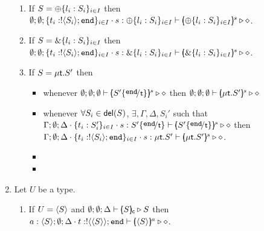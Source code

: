 \begin{proposition}
\begin{enumerate}
\begin{enumerate}
			\item	If $S = \oplus \{l_i: S_i\}_{i \in I}$ then \\
					$\emptyset; \emptyset; \{t_i: ! \langle S_i \rangle ; \mathtt{end}\}_{i \in I} \cdot s: \oplus \{l_i: S_i\}_{i \in I} \vdash [\!\!(\oplus \{l_i: S_i\}_{i \in I})\!\!]^{s} \triangleright \diamond$.
	
			\item	If $S = \& \{l_i: S_i\}_{i \in I}$ then \\
					$\emptyset; \emptyset; \{t_i: ! \langle S_i \rangle ; \mathtt{end}\}_{i \in I} \cdot s: \& \{l_i: S_i\}_{i \in I} \vdash [\!\!(\& \{l_i: S_i\}_{i \in I})\!\!]^{s} \triangleright \diamond $.
	
			\item	If $S = \mu\mathsf{t}.S'$ then 
					\begin{itemize}
						\item whenever $\es; \es; \es \proves \mapchar{S' \subst{\tinact}{\vart{t}}}{s} \hastype \Proc$
						then $\emptyset; \emptyset; \emptyset \vdash [\!\!(\mu\mathsf{t}.S')\!\!]^{s} \triangleright \diamond$

						\item whenever $\forall S_i \in \mathsf{del}(S)$,
						$\exists, \Gamma, \Delta, S_i'$ such that
						$\Gamma; \es; \Delta \cat \set{t_i: S_i'}_{i \in I} \cat s: S' \subst{\tinact}{\vart{t}} \proves \mapchar{S' \subst{\tinact}{\vart{t}}}{s} \hastype \Proc$
						then
						$\Gamma; \emptyset; \Delta \cdot \{t_i: ! \langle S_i \rangle ; \mathtt{end}\}_{i \in I} \cdot s: \mu\mathsf{t}.S' \vdash [\!\!(\mu\mathsf{t}.S')\!\!]^{s} \triangleright \diamond$.

						\item {}

						\item {}
						
						
					\end{itemize}
			\end{enumerate}

		\item	Let $U$ be a type.
		\begin{enumerate}
			\item	If $U = \langle S \rangle$ and $\emptyset; \emptyset; \Delta \vdash [\!\!(S)\!\!]_{\mathsf{c}} \triangleright S$ then 
					$a: \langle S \rangle; \emptyset; \Delta \cdot t: ! \langle \langle S \rangle \rangle ; \mathtt{end} \vdash [\!\!(\langle S \rangle)\!\!]^{a} \triangleright \diamond$.
	

\end{enumerate}
\end{enumerate}
\end{proposition}
